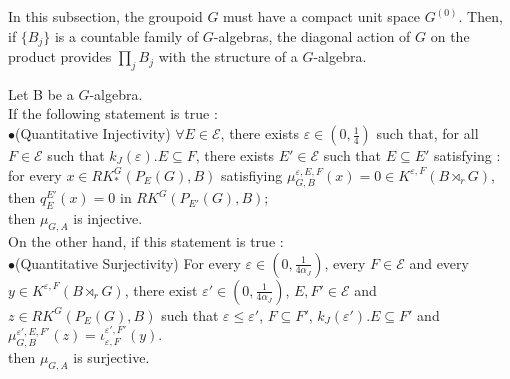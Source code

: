 In this subsection, the groupoid $G$ must have a compact unit space $G^{(0)}$. Then, if $\{B_j\}$ is a countable family of $G$-algebras, the diagonal action of $G$ on the product provides $\prod_j B_j$ with the structure of a $G$-algebra. 

\begin{prop} 
Let B be a $G$-algebra.\\
If the following statement is true :\\

$\bullet$(Quantitative Injectivity) $\forall E\in\mathcal E$, there exists $\varepsilon\in (0,\frac{1}{4})$ such that, for all $F\in\mathcal E$ such that $k_J(\varepsilon) . E\subseteq F$, there exists $E'\in\mathcal E$ such that $E\subseteq E'$ satisfying : for every $x\in RK_*^G(P_E(G),B)$ satisfiying $\mu_{G,B}^{\varepsilon,E,F}(x)=0\in K^{\varepsilon,F}(B\rtimes_r G)$, then $q_E^{E'}(x)=0$ in $RK^G(P_{E'}(G),B)$;\\

then $\mu_{G,A}$ is injective.\\

On the other hand, if this statement is true : \\


$\bullet$(Quantitative Surjectivity) For every $\varepsilon\in (0,\frac{1}{4\alpha_J})$, every $F\in\mathcal E$ and every $y\in K^{\varepsilon,F}(B\rtimes_r G)$, there exist $\varepsilon'\in (0,\frac{1}{4\alpha_J})$, $E,F'\in\mathcal E$ and $z\in RK^G(P_E(G), B)$ such that $\varepsilon\leq \varepsilon'$, $F\subseteq F'$, $k_J(\varepsilon').E\subseteq F'$ and $\mu_{G,B}^{\varepsilon',E,F'}(z) = \iota_{\varepsilon,F}^{\varepsilon',F'}(y)$.  \\

then $\mu_{G,A}$ is surjective.
\end{prop}


